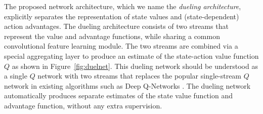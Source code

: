 The proposed network architecture, which we name the {\it dueling architecture}, explicitly separates the representation of state values and (state-dependent) action advantages. The dueling architecture consists of two streams that represent the value and advantage functions, while sharing a common convolutional feature learning module. The two streams are combined via a special aggregating layer to produce an estimate of the state-action value function $Q$ as shown in Figure~\ref{fig:duelnet}. This dueling network should be understood as a single $Q$ network with two streams that replaces the popular single-stream $Q$ network in existing algorithms such as Deep Q-Networks \citep[DQN;][]{Mnih:2015}. The dueling network automatically produces separate estimates of the state value function and advantage function, without any extra supervision. 



